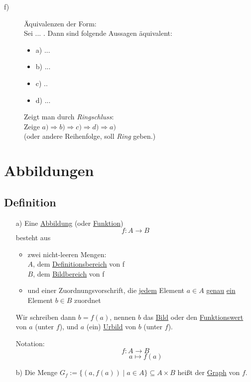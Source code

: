 \documentclass[a4paper, 12pt, twoside] {article}
\begin{document}
\begin{description}
\item[f)]
Äquivalenzen der Form: \\
Sei ... . Dann sind folgende Aussagen äquivalent:

\begin{itemize}
\item a) ...
\item b) ...
\item c) ..
\item d) ...
\end{itemize}

Zeigt man durch \textit{Ringschluss}: \\
Zeige $a) \Rightarrow b) \Rightarrow c) \Rightarrow d) \Rightarrow a)$ \\
(oder andere Reihenfolge, soll \textit{Ring} geben.)

\end{description}


\section{Abbildungen} %

\subsection{Definition} %

\begin{itemize}
\item[a)] Eine \underline{Abbildung} (oder \underline{Funktion})
$$f \colon A \rightarrow B$$ besteht aus
	\begin{itemize}
	\item zwei nicht-leeren Mengen:\\
		$A$, dem \underline{Definitionsbereich} von f \\
		$B$, dem \underline{Bildbereich} von f
	\item und einer Zuordnungsvorschrift, die \underline{jedem} Element 
	$a \in A$ \underline{genau} \underline{ein} Element $b \in B$ zuordnet
	\end{itemize}
	
Wir schreiben dann $b = f(a)$, nennen $b$ das \underline{Bild} oder den \underline{Funktionswert} von $a$ (unter $f$), und $a$ (ein) \underline{Urbild} von $b$ (unter $f$).

Notation:
$$f \colon A \to B$$
$$\qquad\quad a \mapsto f(a)$$

\item[b)] Die Menge $G_f := \{(a,f(a)) \mid a \in A\} \subseteq A \times B$ heißt der \underline{Graph} von $f$.

\end{itemize}
\end{document}
